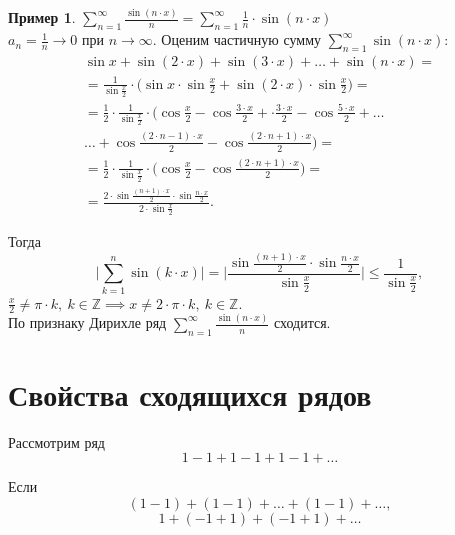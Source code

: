 \documentclass{report}
\theoremstyle{definition}
\newtheorem{example}{Пример}
\begin{document}
\begin{example}
  $\sum_{n=1}^{\infty} \frac{\sin (n\cdot x)}{n} = \sum_{n=1}^{\infty} \frac{1}{n} \cdot \sin (n\cdot x)$ \\

  $a_n = \frac{1}{n}\rightarrow 0$ при $n\rightarrow\infty$. Оценим частичную сумму $\sum_{n=1}^{\infty}\sin (n\cdot x)$:
  \begin{multline*}
    \sin x + \sin (2\cdot x) + \sin (3\cdot x) + \ldots + \sin (n\cdot x) = \\
    = \frac{1}{\sin \frac{x}{2}} \cdot \bigg(\sin x \cdot \sin \frac{x}{2} + \sin (2\cdot x) \cdot \sin\frac{x}{2}\bigg) = \\
    = \frac{1}{2} \cdot \frac{1}{\sin\frac{x}{2}} \cdot \bigg(\cos \frac{x}{2} - \cos \frac{3\cdot x}{2} + \cdot \frac{3\cdot x}{2} - \cos \frac{5\cdot x}{2} + \ldots \\
    \ldots + \cos \frac{(2\cdot n-1)\cdot x}{2} - \cos \frac{(2\cdot n+1) \cdot x}{2}\bigg) = \\
    = \frac{1}{2} \cdot \frac{1}{\sin \frac{x}{2}} \cdot \bigg(\cos \frac{x}{2} - \cos \frac{(2\cdot n + 1) \cdot x}{2}\bigg) = \\
    = \frac{2\cdot \sin \frac{(n+1)\cdot x}{2} \cdot \sin \frac{n\cdot x}{2}}{2\cdot \sin \frac{x}{2}}.
  \end{multline*}

  Тогда
  \begin{equation*}
    \bigg|\sum_{k=1}^{n} \sin (k\cdot x)\bigg| = \bigg|\frac{\sin\frac{(n+1)\cdot x}{2}\cdot \sin \frac{n \cdot x}{2}}{\sin \frac{x}{2}}\bigg| \leqslant \frac{1}{\sin\frac{x}{2}},
  \end{equation*}
  $\frac{x}{2} \ne \pi \cdot k, \ k \in \mathbb{Z} \implies x \ne 2 \cdot \pi \cdot k, \ k \in \mathbb{Z}$. \\

  По признаку Дирихле ряд $\sum_{n=1}^{\infty}\frac{\sin (n\cdot x)}{n}$ сходится. 
\end{example}

\section{Свойства сходящихся рядов}

Рассмотрим ряд
\begin{equation*}
  1-1+1-1+1-1+\ldots
\end{equation*}

Если
\begin{equation*}
  (1-1) + (1-1) + \ldots + (1-1) + \ldots,
\end{equation*}
\begin{equation*}
  1 + (-1 + 1) + (-1 + 1) + \ldots
\end{equation*}
\end{document}

